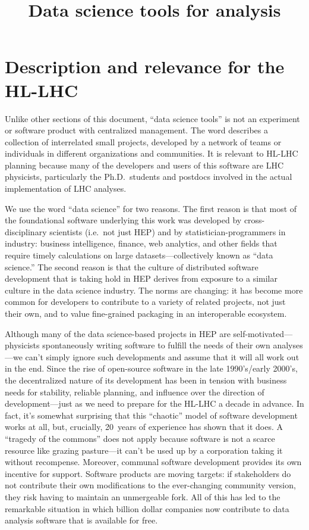 \documentclass{article}
\begin{document}
\title{Data science tools for analysis}
\maketitle

\section{Description and relevance for the HL-LHC}

Unlike other sections of this document, ``data science tools'' is not an experiment or software product with centralized management. The word describes a collection of interrelated small projects, developed by a network of teams or individuals in different organizations and communities. It is relevant to HL-LHC planning because many of the developers and users of this software are LHC physicists, particularly the Ph.D.\ students and postdocs involved in the actual implementation of LHC analyses.

We use the word ``data science'' for two reasons. The first reason is that most of the foundational software underlying this work was developed by cross-disciplinary scientists (i.e.\ not just HEP) and by statistician-programmers in industry: business intelligence, finance, web analytics, and other fields that require timely calculations on large datasets---collectively known as ``data science.'' The second reason is that the culture of distributed software development that is taking hold in HEP derives from exposure to a similar culture in the data science industry. The norms are changing: it has become more common for developers to contribute to a variety of related projects, not just their own, and to value fine-grained packaging in an interoperable ecosystem.

Although many of the data science-based projects in HEP are self-motivated---physicists spontaneously writing software to fulfill the needs of their own analyses---we can't simply ignore such developments and assume that it will all work out in the end. Since the rise of open-source software in the late 1990's/early 2000's, the decentralized nature of its development has been in tension with business needs for stability, reliable planning, and influence over the direction of development---just as we need to prepare for the HL-LHC a decade in advance. In fact, it's somewhat surprising that this ``chaotic'' model of software development works at all, but, crucially, 20~years of experience has shown that it does. A ``tragedy of the commons'' does not apply because software is not a scarce resource like grazing pasture---it can't be used up by a corporation taking it without recompense. Moreover, communal software development provides its own incentive for support. Software products are moving targets: if stakeholders do not contribute their own modifications to the ever-changing community version, they risk having to maintain an unmergeable fork. All of this has led to the remarkable situation in which billion dollar companies now contribute to data analysis software that is available for free.
\end{document}
